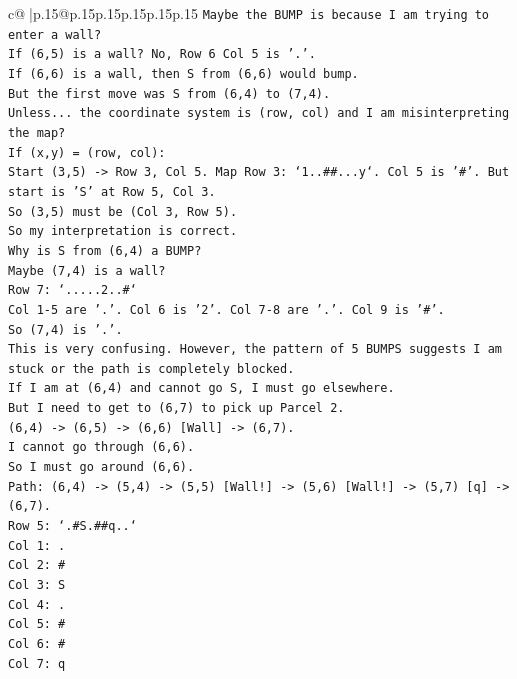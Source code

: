 \documentclass{article}
\begin{document}
{\begin{supertabular}{c@{$\;$}|p{.15\linewidth}@{}p{.15\linewidth}p{.15\linewidth}p{.15\linewidth}p{.15\linewidth}p{.15\linewidth}}
{{{\texttt{Maybe the BUMP is because I am trying to enter a wall?} \\
\texttt{If (6,5) is a wall? No, Row 6 Col 5 is '.'.} \\
\texttt{If (6,6) is a wall, then S from (6,6) would bump.} \\
\texttt{But the first move was S from (6,4) to (7,4).} \\
\texttt{Unless... the coordinate system is (row, col) and I am misinterpreting the map?} \\
\texttt{If (x,y) = (row, col):} \\
\texttt{Start (3,5) {-}> Row 3, Col 5. Map Row 3: `1..\#\#...y`. Col 5 is '\#'. But start is 'S' at Row 5, Col 3.} \\
\texttt{So (3,5) must be (Col 3, Row 5).} \\
\texttt{So my interpretation is correct.} \\
\texttt{Why is S from (6,4) a BUMP?} \\
\texttt{Maybe (7,4) is a wall?} \\
\texttt{Row 7: `.....2..\#`} \\
\texttt{Col 1{-}5 are '.'. Col 6 is '2'. Col 7{-}8 are '.'. Col 9 is '\#'.} \\
\texttt{So (7,4) is '.'.} \\
\texttt{This is very confusing. However, the pattern of 5 BUMPS suggests I am stuck or the path is completely blocked.} \\
\texttt{If I am at (6,4) and cannot go S, I must go elsewhere.} \\
\texttt{But I need to get to (6,7) to pick up Parcel 2.} \\
\texttt{(6,4) {-}> (6,5) {-}> (6,6) {[}Wall{]} {-}> (6,7).} \\
\texttt{I cannot go through (6,6).} \\
\texttt{So I must go around (6,6).} \\
\texttt{Path: (6,4) {-}> (5,4) {-}> (5,5) {[}Wall!{]} {-}> (5,6) {[}Wall!{]} {-}> (5,7) {[}q{]} {-}> (6,7).} \\
\texttt{Row 5: `.\#S.\#\#q..`} \\
\texttt{Col 1: .} \\
\texttt{Col 2: \#} \\
\texttt{Col 3: S} \\
\texttt{Col 4: .} \\
\texttt{Col 5: \#} \\
\texttt{Col 6: \#} \\
\texttt{Col 7: q} \\
}}}
\end{supertabular}}
\end{document}
